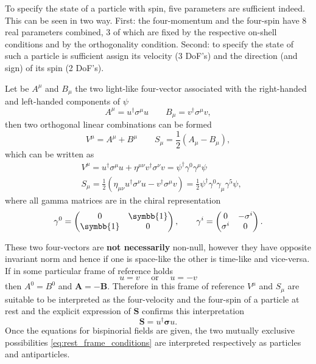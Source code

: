 To specify the state of a particle with spin, five parameters are sufficient indeed. This can be seen in two way. First: the four-momentum and the four-spin have 8 real parameters combined, 3 of which are fixed by the respective on-shell conditions and by the orthogonality condition. Second: to specify the state of such a particle is sufficient assign its velocity (3 DoF's) and the direction (and sign) of its spin (2 DoF's).

Let be $A^\mu$ and $B_\mu$ the two light-like four-vector associated with the right-handed and left-handed components of $\psi$
\begin{equation}
  A^\mu = u^\dagger \sigma^\mu u \qquad B_\mu = v^\dagger \sigma^\mu v ,
\end{equation}
then two orthogonal linear combinations can be formed
\begin{equation}
  V^\mu = A^\mu + B^\mu \qquad S_\mu = \frac{1}{2} \left( A_\mu - B_\mu \right),
\end{equation}
which can be written as
\begin{align}
  & V^\mu = u^\dagger \sigma^\mu u + \eta^{\mu \nu} v^\dagger \sigma^\nu v  = \psi^\dagger \gamma^0 \gamma^\mu \psi \\
  & S_\mu = \frac{1}{2} \left( \eta_{\mu \nu} u^\dagger \sigma^\nu u - v^\dagger \sigma^\mu v \right)  = \frac{1}{2} \psi^\dagger \gamma^0 \gamma_\mu \gamma^5 \psi ,
\end{align}
where all gamma matrices are in the chiral representation
\begin{equation}
  \gamma^0 = \begin{pmatrix} 0 & \symbb{1} \\ \symbb{1} & 0 \end{pmatrix} , \qquad \gamma^i = \begin{pmatrix} 0 & - \sigma^i \\ \sigma^i & 0 \end{pmatrix} .
\end{equation}

These two four-vectors are \textbf{not necessarily} non-null, however they have opposite invariant norm and hence if one is space-like the other is time-like and vice-versa. If in some particular frame of reference holds
\begin{equation}
  u = v \quad \text{ or } \quad u = - v 
  \label{eq:rest_frame_conditions}
\end{equation}
then $A^0 = B^0$ and $\symbf{A} = - \symbf{B}$. Therefore in this frame of reference $V^\mu$ and $S_\mu$ are suitable to be interpreted as the four-velocity and the four-spin of a particle at rest and the explicit expression of $\symbf{S}$ confirms this interpretation
\begin{equation}
  \symbf{S} = u^\dagger \symbf{\sigma} u .
\end{equation}
Once the equations for bispinorial fields are given, the two mutually exclusive possibilities \eqref{eq:rest_frame_conditions} are interpreted respectively as particles and antiparticles.

